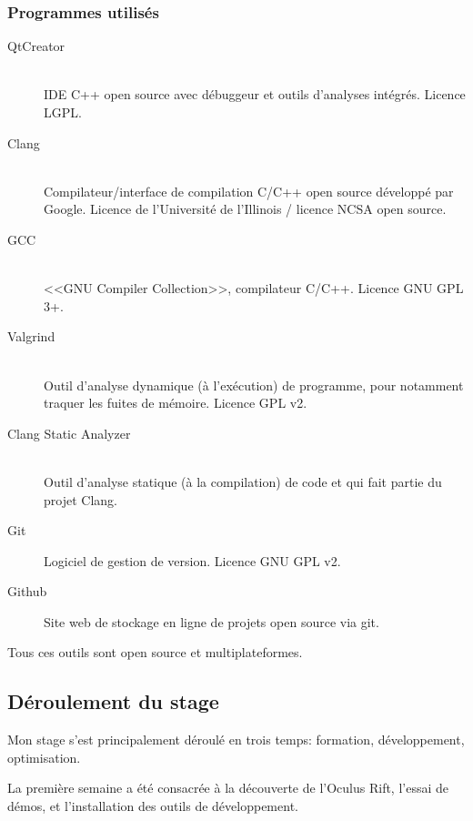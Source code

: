 \documentclass[a4paper,french,12pt]{article}
\begin{document}
		
		
		\subsubsection{Programmes utilisés}
		  \begin{description}
		   \item [QtCreator]~\\
		      IDE C++ open source avec débuggeur et outils d'analyses intégrés.
		      Licence LGPL.
		   
		   \item [Clang]~\\
		      Compilateur/interface de compilation C/C++ open source développé par Google.
		      Licence de l'Université de l'Illinois / licence  NCSA open source.
		   
		   \item [GCC]~\\
		      <<GNU Compiler Collection>>, compilateur C/C++.
		      Licence GNU GPL 3+.
		    
		   \item [Valgrind]~\\
		      Outil d'analyse dynamique (à l'exécution) de programme, pour notamment traquer les fuites de mémoire.
		      Licence GPL v2.
		   
		   \item [Clang Static Analyzer]~\\
		      Outil d'analyse statique (à la compilation) de code et qui fait partie du projet Clang.
		      
		   \item [Git]
		      Logiciel de gestion de version.
		      Licence GNU GPL v2.
		      
		   \item [Github]
		      Site web de stockage en ligne de projets open source via git.
		   
		  \end{description}

		Tous ces outils sont open source et multiplateformes.
		
	\subsection{Déroulement du stage}
	
		Mon stage s'est principalement déroulé en trois temps: formation, développement, optimisation.
		
		La première semaine a été consacrée à la découverte de l'Oculus Rift, l'essai de démos, et l'installation
		des outils de développement.
		
\end{document}
